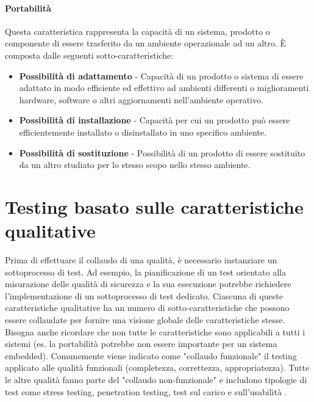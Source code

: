 \documentclass[../main.tex]{subfiles}
\begin{document}
\paragraph{Portabilità}
Questa caratteristica rappresenta la capacità di un sistema, prodotto o componente di essere trasferito da un ambiente operazionale ad un altro.
È composta dalle seguenti sotto-caratteristiche:
\begin{itemize}
\item \textbf{Possibilità di adattamento} - Capacità di un prodotto o sistema di essere adattato in modo efficiente ed effettivo ad ambienti differenti o miglioramenti hardware, software o altri aggiornamenti nell'ambiente operativo.
\item \textbf{Possibilità di installazione} - Capacità per cui un prodotto può essere efficientemente installato o disinstallato in uno specifico ambiente.
\item \textbf{Possibilità di sostituzione} - Possibilità di un prodotto di essere sostituito da un altro studiato per lo stesso scopo nello stesso ambiente.
\end{itemize}

\section{Testing basato sulle caratteristiche qualitative}
Prima di effettuare il collaudo di una qualità, è necessario instanziare un sottoprocesso di test. Ad esempio, la pianificazione di un test orientato alla misurazione delle qualità di sicurezza e la sua esecuzione potrebbe richiedere l'implementazione di un sottoprocesso di test dedicato.
Ciascuna di queste caratteristiche qualitative ha un numero di sotto-caratteristiche che possono essere collaudate per fornire una visione globale delle caratteristiche stesse. Bisogna anche ricordare che non tutte le caratteristiche sono applicabili a tutti i sistemi (es. la portabilità potrebbe non essere importante per un sistema embedded).
Comunemente viene indicato come "collaudo funzionale" il testing applicato alle qualità funzionali (completezza, correttezza, appropriatezza). Tutte le altre qualità fanno parte del "collaudo non-funzionale" e includono tipologie di test come stress testing, penetration testing, test sul carico e sull'usabilità \cite{iso29119}.
\end{document}
